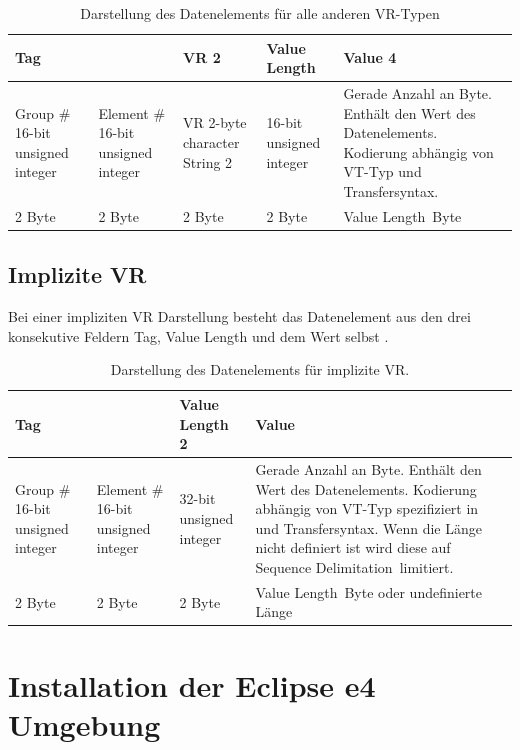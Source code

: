 \begin{table}
	\begin{tabularx}{\textwidth}{|X|X|X|X|p{12cm}|}
	\toprule \hline
	\multicolumn{2}{|l|}{\textbf{Tag}} & \textbf{VR} 2 & \textbf{Value Length} & \textbf{Value} 4 \\ \hline
	Group \# 16-bit unsigned integer & Element \# 16-bit unsigned integer & VR 2-byte character String 2 & 16-bit unsigned integer & Gerade Anzahl an Byte. Enthält den Wert des Datenelements. Kodierung abhängig von VT-Typ und Transfersyntax. \\ \hline
	2 Byte & 2 Byte & 2 Byte & 2 Byte & \glqq Value Length\grqq\ Byte \\ \hline
	\bottomrule
	\end{tabularx}
    \caption {Darstellung des Datenelements für alle anderen VR-Typen}
    \label{table:appendix_explizit_else}
\end{table}

\section{Implizite VR}

Bei einer impliziten VR Darstellung besteht das Datenelement aus den drei konsekutive Feldern Tag, Value Length und dem Wert selbst \cite[7.1.3]{dicom:structure}.

\begin{table}
	\begin{tabularx}{\textwidth}{|X|X|X|p{12cm}|}
	\toprule \hline
	\multicolumn{2}{|l|}{\textbf{Tag}} & \textbf{Value Length} 2 & \textbf{Value} \\ \hline
	Group \# 16-bit unsigned integer & Element \# 16-bit unsigned integer & 32-bit unsigned integer & Gerade Anzahl an Byte. Enthält den Wert des Datenelements. Kodierung abhängig von VT-Typ spezifiziert in \cite{dicom:dd} und Transfersyntax. Wenn die Länge nicht definiert ist wird diese auf \glqq Sequence Delimitation\grqq\ limitiert. \\ \hline
	2 Byte & 2 Byte & 2 Byte & \glqq Value Length\grqq\ Byte oder undefinierte Länge \\ \hline
	
	\bottomrule
	
	\end{tabularx}
    \caption {Darstellung des Datenelements für implizite VR.}
    \label{table:appendix_implizit}
\end{table}


\chapter{Installation der Eclipse e4 Umgebung} \label{install_eclipse}

